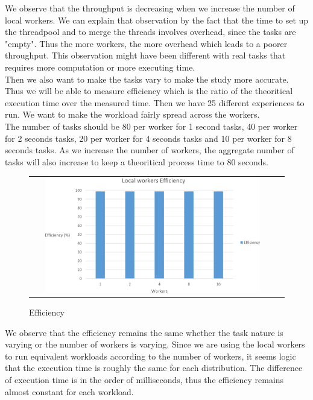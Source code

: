 \documentclass{article}
\begin{document}
We observe that the throughput is decreasing when we increase the number of local workers. We can explain that observation by the fact that the time to set up the threadpool and to merge the threads involves overhead, since the tasks are "empty". Thus the more workers, the more overhead which leads to a poorer throughput. This observation might have been different with real tasks that requires more computation or more executing time.\\

Then we also want to make the tasks vary to make the study more accurate. Thus we will be able to measure efficiency which is the ratio of the theoritical execution time over the measured time. Then we have 25 different experiences to run. We want to make the workload fairly spread across the workers.\\ 

The number of tasks should be 80 per worker for 1 second tasks, 40 per worker for 2 seconds tasks, 20 per worker for 4 seconds tasks and 10 per worker for 8 seconds tasks. As we increase the number of workers, the aggregate number of tasks will also increase to keep a theoritical process time to 80 seconds.

\begin{figure}[H]
\centering
\begin{tabular}{cc}
\includegraphics[width=0.9\textwidth]{local_workers.png}
\end{tabular}
\caption{Efficiency}
\end{figure}

We observe that the efficiency remains the same whether the task nature is varying or the number of workers is varying. Since we are using the local workers to run equivalent  workloads according to the number of workers, it seems logic that the execution time is roughly the same for each distribution. The difference of execution time is in the order of milliseconds, thus the efficiency remains almost constant for each workload.\\
\end{document}
